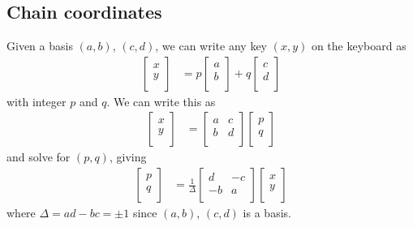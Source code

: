 \documentclass[a4paper,11pt]{article}
\begin{document}
\subsection{Chain coordinates}
Given a basis $(a, b)$, $(c, d)$, we can write any key $(x, y)$ on the keyboard as
\begin{align}
\begin{bmatrix}
    x \\
    y \\
\end{bmatrix}
    &=
p
\begin{bmatrix}
    a \\
    b \\
\end{bmatrix}
+
q
\begin{bmatrix}
    c \\
    d \\
\end{bmatrix}
\end{align}
with integer $p$ and $q$. We can write this as
\begin{align}
\begin{bmatrix}
    x \\
    y \\
\end{bmatrix}
    &=
\begin{bmatrix}
    a & c \\
    b & d \\
\end{bmatrix}
\begin{bmatrix}
    p \\
    q \\
\end{bmatrix}
\end{align}
and solve for $(p, q)$, giving
\begin{align}
\begin{bmatrix}
    p \\
    q \\
\end{bmatrix}
    &=
\frac{1}{\Delta}
\begin{bmatrix}
    d & -c \\
    -b & a \\
\end{bmatrix}
\begin{bmatrix}
    x \\
    y \\
\end{bmatrix}
\end{align}
where $\Delta = ad - bc = \pm 1$ since $(a, b)$, $(c, d)$ is a basis.
\end{document}
